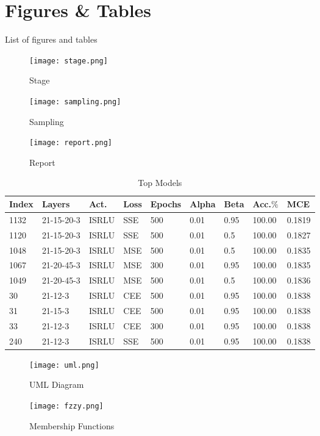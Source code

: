 \newpage

\section{Figures \& Tables}
List of figures and tables
\begin{figure}
    \centering
    \texttt{[image: stage.png]}
    \caption{Stage}
    \label{fig:stage}
\end{figure}
\begin{figure}
    \centering
    \texttt{[image: sampling.png]}
    \caption{Sampling}
    \label{fig:sampling}
\end{figure}

\begin{figure}
    \centering
    \texttt{[image: report.png]}
    \caption{Report}
    \label{fig:report}
\end{figure}

\begin{table}
    \centering
    \begin{tabular}{|l|l|l|l|l|l|l|l|l|}
    \hline
        Index & Layers & Act. & Loss & Epochs & Alpha & Beta & Acc.\(\%\) & MCE \\ \hline
        1132 & 21-15-20-3 & ISRLU & SSE & 500 & 0.01 & 0.95 & 100.00 & 0.1819 \\ \hline
        1120 & 21-15-20-3 & ISRLU & SSE & 500 & 0.01 & 0.5 & 100.00 & 0.1827 \\ \hline
        1048 & 21-15-20-3 & ISRLU & MSE & 500 & 0.01 & 0.5 & 100.00 & 0.1835 \\ \hline
        1067 & 21-20-45-3 & ISRLU & MSE & 300 & 0.01 & 0.95 & 100.00 & 0.1835 \\ \hline
        1049 & 21-20-45-3 & ISRLU & MSE & 500 & 0.01 & 0.5 & 100.00 & 0.1836 \\ \hline
        30 & 21-12-3 & ISRLU & CEE & 500 & 0.01 & 0.95 & 100.00& 0.1838 \\ \hline
        31 & 21-15-3 & ISRLU & CEE & 500 & 0.01 & 0.95 & 100.00& 0.1838 \\ \hline
        33 & 21-12-3 & ISRLU & CEE & 300 & 0.01 & 0.95 & 100.00& 0.1838 \\ \hline
        240 & 21-12-3 & ISRLU & SSE & 500 & 0.01 & 0.95 & 100.00 & 0.1838 \\ \hline
    \end{tabular}
    \caption{Top Models}
    \label{table:top_models}
\end{table}


\begin{figure}
    \centering
    \texttt{[image: uml.png]}
    \caption{UML Diagram}
    \label{fig:uml}
\end{figure}

\begin{figure}
    \centering
    \texttt{[image: fzzy.png]}
    \caption{Membership Functions}
    \label{fig:fuzzy}
\end{figure}